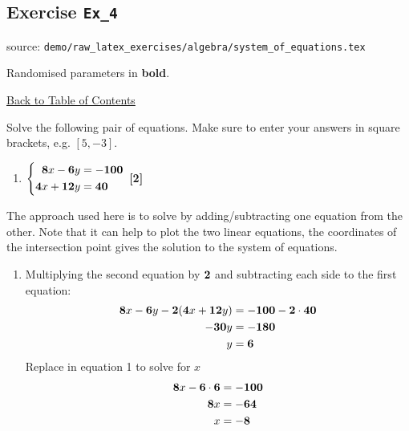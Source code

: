 \documentclass[a4paper, leqno, 12pt]{report}
\newenvironment{top_enumerate}{
\begin{enumerate}
  \setlength{\itemsep}{2em}
  \setlength{\topsep}{-0pt}
  \setlength{\partopsep}{-0pt}
}{\end{enumerate}}
\begin{document}
\subsection{Exercise \texttt{Ex\_4}}
source: \texttt{demo/raw\_latex\_exercises/algebra/system\_of\_equations.tex}

Randomised parameters in \textbf{bold}. 

\hyperlink{contents}{Back to Table of Contents}
\begin{top_enumerate}
\item Solve the following pair of equations. Make sure to enter your answers in square brackets, e.g. $[5,-3]$.
 
\setcounter{equation}{0}  %
\begin{enumerate}
	\setlength{\topsep}{-0pt}
	\setlength{\partopsep}{-0pt}
	\setlength{\itemsep}{10pt}
			\item $\left\{\begin{aligned}
	{\bf 8}x - {\bf 6}y & = {\bf -100}\\
	{\bf 4}x + {\bf 12}y & = {\bf 40}\\
	\end{aligned}\right.$
	 \quad \textbf{[2]}
\end{enumerate}\addtocounter{enumi}{-1}
\item The approach used here is to solve by adding/subtracting one equation from the other. Note that it can help to plot the two linear equations, the coordinates of the intersection point gives the solution to the system of equations.
 
\setcounter{equation}{0}  %
\begin{enumerate}
	\setlength{\topsep}{-0pt}
	\setlength{\partopsep}{-0pt}
	\setlength{\itemsep}{10pt}
			\item Multiplying the second equation by ${\bf 2}$ and subtracting each side to the first equation:
	\[
	\begin{aligned}
	{\bf 8}x - {\bf 6}y - {\bf 2}({\bf 4}x + {\bf 12}y) & = {\bf -100} - {\bf 2}\cdot{\bf 40}\\
	{\bf -30}y & = {\bf -180}\\
	y & = {\bf 6}\\
	\end{aligned}
	\]
	Replace in equation 1 to solve for $x$
	\[
	\begin{aligned}
	{\bf 8}x-{\bf 6}\cdot{\bf 6} & = {\bf -100}\\
	{\bf 8}x & = {\bf -64}\\
	x & = {\bf -8}\\
	\end{aligned}
	\]
	

\end{enumerate}
\end{top_enumerate}
\end{document}
